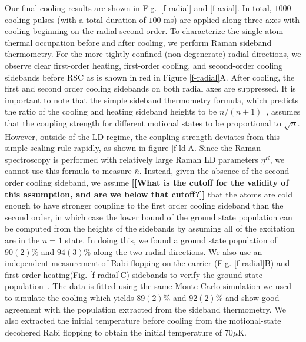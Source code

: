 \documentclass[aps,prl,twocolumn,groupedaddress]{revtex4-1}
\newcommand{\fxnote}[1]{{\textbf{[#1]}}}
\begin{document}
Our final cooling results are shown in Fig.~\ref{f-radial} and \ref{f-axial}.
In total, $1000$ cooling pulses (with a total duration of $100$ ms) are applied along three axes with
cooling beginning on the radial second order.
To characterize the single atom thermal occupation before and after cooling,
we perform Raman sideband thermometry.
For the more tightly confined (non-degenerate) radial directions,
we observe clear first-order heating, first-order cooling,
and second-order cooling sidebands before RSC as is shown in red in Figure \ref{f-radial}A.
After cooling, the first and second order cooling sidebands on both radial axes are suppressed.
It is important to note that the simple sideband thermometry formula,
which predicts the ratio of the cooling and heating sideband heights
to be $\bar n / (\bar n + 1)$~\cite{Monroe1995},
assumes that the coupling strength for different motional states to be proportional to $\sqrt{n}$.
However, outside of the LD regime, the coupling strength deviates from this simple scaling rule rapidly,
as shown in figure \ref{f-ld}A.  Since the Raman spectroscopy is performed
with relatively large Raman LD parameters $\eta^R$, we cannot use this formula to
measure $\bar n$.
Instead, given the absence of the second order cooling sideband,
we assume \fxnote{[What is the cutoff for the validity of this assumption, and are we below that cutoff?]} that the atoms are cold enough to have stronger coupling to the first order cooling
sideband than the second order, in which case the lower bound of the ground state population
can be computed from the heights of the sidebands by assuming all of the excitation are in the
$n=1$ state. In doing this, we found a ground state population of $90(2)$\%
and $94(3)$\% along the two radial directions.
We also use an independent measurement of Rabi flopping on the carrier (Fig. \ref{f-radial}B)
and first-order heating(Fig. \ref{f-radial}C) sidebands
to verify the ground state population~\cite{Meekhof1996}.
The data is fitted using the same Monte-Carlo simulation we used to simulate the cooling
which yields $89(2)$\% and $92(2)$\% and show good agreement with
the population extracted from the sideband thermometry.
We also extracted the initial temperature before cooling
from the motional-state decohered Rabi flopping to obtain the initial temperature of $70 \mu$K.
\end{document}
